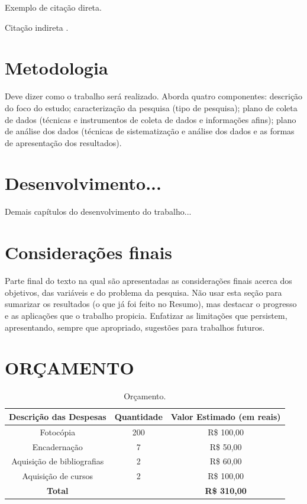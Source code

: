 \documentclass{unemat-tex}
\begin{document}
		\begin{citacao}
		Exemplo de citação direta. \cite{nomenacitacao}
	\end{citacao}
	
	Citação indireta \cite{nomenacitacao}.
	
\chapter{Metodologia}
	
	Deve dizer como o trabalho será realizado. Aborda quatro componentes: descrição do foco do estudo; caracterização da pesquisa (tipo de pesquisa); plano de coleta de dados (técnicas e instrumentos de coleta de dados e informações afins); plano de análise dos dados (técnicas de sistematização e análise dos dados e as formas de apresentação dos resultados).
	
\chapter{Desenvolvimento...}
	
	Demais capítulos do desenvolvimento do trabalho...

\chapter{Considerações finais}

	Parte final do texto na qual são apresentadas as considerações finais acerca dos objetivos, das variáveis e do problema da pesquisa. Não usar esta seção para sumarizar os resultados (o que já foi feito no Resumo), mas destacar o progresso e as aplicações que o trabalho propicia. Enfatizar as limitações que persistem, apresentando, sempre que apropriado, sugestões para trabalhos futuros.
	
\chapter{ORÇAMENTO}
\begin{table}[!h]
	\caption[Orcamento]{Orçamento.}
	\label{tab-nivinv}	
	\begin{tabular}{|c|c|c|}
		\hline
		\textbf{Descrição das Despesas} & \textbf{Quantidade} & \textbf{Valor Estimado (em reais)} \\ \hline
		Fotocópia & 200 & R\$ 100,00 \\ \hline
		Encadernação & 7 & R\$ 50,00 \\ \hline
		Aquisição de bibliografias & 2 & R\$ 60,00 \\ \hline
		Aquisição de cursos & 2 & R\$ 100,00 \\ \hline
		\textbf{Total} &  & \textbf{R\$ 310,00} \\ \hline
	\end{tabular}
\end{table}
\end{document}
